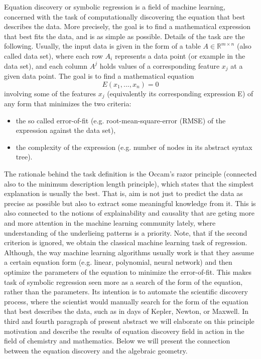 \documentclass[runningheads]{llncs}
\begin{document}
Equation discovery or symbolic regression is a field of machine learning, concerned with 
the task of computationally discovering the equation that best describes the data.
More precisely, the goal is to find a mathematical expression that best fits the data, and is as simple as possible.
Details of the task are the following.
Usually, the input data is given in the form of a table $A \in \mathbb{R}^{m \times n}$ (also called data set), where each row $A_i$ represents a data point (or example in the data set), and each column $A^j$ holds values of a corresponding
feature $x_j$ at a given data point.
The goal is to find a mathematical equation 
    $$E(x_1, ..., x_n) = 0$$ 
    involving some of the features $x_j$ 
    (equivalently its corresponding expression E) of any form that minimizes the two criteria: 
    \begin{itemize}
        \item the so called error-of-fit (e.g. root-mean-square-error (RMSE) of the expression against the data set), 
        \item the complexity of the expression (e.g. number of nodes in its abstract syntax tree).
    \end{itemize}
The rationale behind the task definition is the Occam's razor principle (connected also to the minimum description length principle),
which states that the simplest explanation is usually the best.
That is, aim is not just to predict the data as precise as possible but 
also to extract some meaningful knowledge from it.
This is also connected to the notions of explainability and causality
that are geting more and more attention 
in the machine learning community lately,
where understanding of the underlieing patterns is a priority.
Note, that if the second criterion is ignored, we obtain the classical machine learning task of regression.
Although, the way machine learning algorithms usually work is that they assume a certain equation form 
(e.g. linear, polynomial, neural network) and then optimize the parameters of the equation to minimize the error-of-fit.
This makes task of symbolic regression seen more as a search of the form of the equation, rather than the parameters.
Its intention is to automate the scientific discovery process, where the scientist would manually search for 
the form of the equation that best describes the data, such as in days of Kepler, Newton, or Maxwell.
In third and fourth paragraph of present abstract we will elaborate on this principle motivation and describe
the results of equation discovery field in action in the field of chemistry and mathematics.
Below we will present the connection between the equation discovery and the algebraic geometry.
\end{document}
